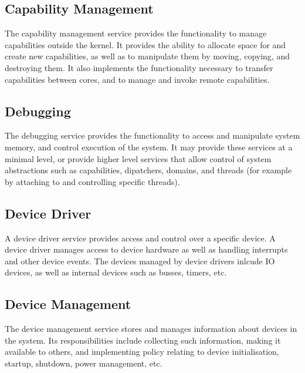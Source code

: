 \documentclass[a4paper,twoside]{report} %
\begin{document}

\subsection{Capability Management}


The capability management service provides the functionality to manage
capabilities outside the kernel.  It provides the ability to allocate
space for and create new capabilities, as well as to manipulate them
by moving, copying, and destroying them.  It also implements the
functionality necessary to transfer capabilities between cores, and to
manage and invoke remote capabilities.


\subsection{Debugging}


The debugging service provides the functionality to access and
manipulate system memory, and control execution of the system.  It may
provide these services at a minimal level, or provide higher level
services that allow control of system abstractions such as
capabilities, dipatchers, domains, and threads (for example by
attaching to and controlling specific threads).


\subsection{Device Driver}


A device driver service provides access and control over a specific
device.  A device driver manages access to device hardware as well as
handling interrupts and other device events.  The devices managed by
device drivers inlcude IO devices, as well as internal devices such as
busses, timers, etc.

\subsection{Device Management}


The device management service stores and manages information about
devices in the system. Its responsibilities include collecting such
information, making it available to others, and implementing policy
relating to device initialisation, startup, shutdown, power management, etc.
\end{document}
